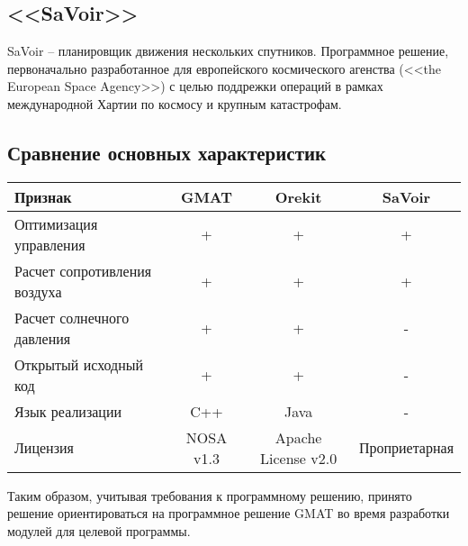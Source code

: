 \subsection{<<SaVoir>>}
\noindent\indent SaVoir -- планировщик движения нескольких спутников. Программное
решение, первоначально разработанное для европейского космического агенства
(<<the European Space Agency>>) с целью поддрежки операций в рамках международной
Хартии по космосу и крупным катастрофам.
\subsection{Сравнение основных характеристик}
\begin{tabular}{|l|c|c|c|}
  \hline
  Признак                      & GMAT                            & Orekit              & SaVoir \\ \hline
  Оптимизация управления       & +                               & +                   & +      \\ \hline
  Расчет сопротивления воздуха & +                               & +                   & +      \\ \hline
  Расчет солнечного давления   & +                               & +                   & -      \\ \hline
  Открытый исходный код        & +                               & +                   & -      \\ \hline
  Язык реализации              & C++                             & Java                & -      \\ \hline
  Лицензия                     & NOSA v1.3 & Apache License v2.0 & Проприетарная \\ \hline
\end{tabular}\par
Таким образом, учитывая требования к программному решению, принято решение
ориентироваться на программное решение GMAT во время разработки модулей для целевой программы.
